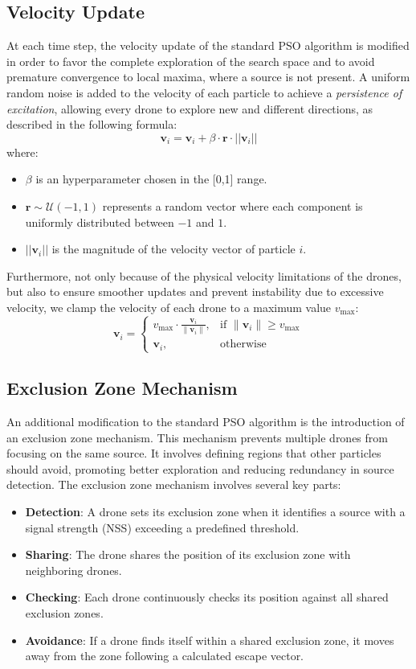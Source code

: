 \subsection{Velocity Update}
At each time step, the velocity update of the standard PSO algorithm is modified in order to favor the complete 
exploration of the search space and to avoid premature convergence to local maxima, where a source is not present. 
A uniform random noise is added to the velocity of each particle to achieve a \textit{persistence of excitation},
allowing every drone to explore new and different directions, 
as described in the following formula:
\[
\mathbf{v}_i = \mathbf{v}_i + \beta \cdot \mathbf{r} \cdot ||\mathbf{v}_i||
\] \label{eq:persistence_of_excitation}
where:
\begin{itemize}
    \item \(\beta\) is an hyperparameter chosen in the [0,1] range.
    \item \(\mathbf{r} \sim \mathcal{U}(-1, 1)\) represents a random vector where each component is uniformly distributed between \(-1\) and \(1\).
    \item \(||\mathbf{v}_i||\) is the magnitude of the velocity vector of particle \(i\).
\end{itemize}
Furthermore, not only because of the physical velocity limitations of the drones, but also to ensure smoother updates 
and prevent instability due to excessive velocity, we clamp the velocity of each drone 
to a maximum value \(v_{\text{max}}\):
\[
\mathbf{v}_i = 
\begin{cases} 
v_{\text{max}} \cdot \frac{\mathbf{v}_i}{\|\mathbf{v}_i\|}, & \text{if } \|\mathbf{v}_i\| \geq v_{\text{max}} \\
\mathbf{v}_i, & \text{otherwise}
\end{cases}
\] \label{eq:velocity_clamping}


\subsection{Exclusion Zone Mechanism}
An additional modification to the standard PSO algorithm 
is the introduction of an exclusion zone mechanism.
This mechanism prevents multiple drones from focusing 
on the same source. It involves defining regions that 
other particles should avoid, promoting better exploration 
and reducing redundancy in source detection. The exclusion 
zone mechanism involves several key parts:
\begin{itemize}
    \item \textbf{Detection}: A drone sets its exclusion zone 
    when it identifies a source with a signal strength (NSS) 
    exceeding a predefined threshold.
    \item \textbf{Sharing}: The drone shares the position of 
    its exclusion zone with neighboring drones.
    \item \textbf{Checking}: Each drone continuously checks 
    its position against all shared exclusion zones.
    \item \textbf{Avoidance}: If a drone finds itself within 
    a shared exclusion zone, it moves away from the zone 
    following a calculated escape vector.
\end{itemize}

